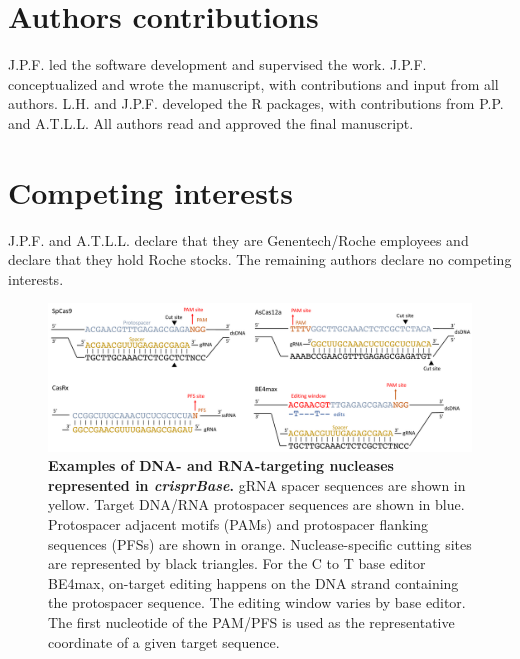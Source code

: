 \documentclass[pdftex,english,10pt]{article}
\begin{document}
{%
\section*{Authors contributions}

J.P.F. led the software development and supervised the work.
J.P.F. conceptualized and wrote the manuscript, with contributions and input from all authors. 
L.H. and J.P.F. developed the R packages, with contributions from P.P. and A.T.L.L. 
All authors read and approved the final manuscript.

\section*{Competing interests}

J.P.F. and A.T.L.L. declare that they are Genentech/Roche employees and declare that they hold Roche stocks. 
The remaining authors declare no competing interests.


\clearpage

\begin{figure}[!h]
\centering
\includegraphics[width=1\textwidth]{Figure1.pdf}
  \caption{\textbf{Examples of DNA- and RNA-targeting nucleases represented in \textit{crisprBase}.} gRNA spacer sequences are shown in yellow. Target DNA/RNA protospacer sequences are shown in blue. Protospacer adjacent motifs (PAMs) and protospacer flanking sequences (PFSs) are shown in orange. Nuclease-specific cutting sites are represented by black triangles. For the C to T base editor BE4max, on-target editing happens on the DNA strand containing the protospacer sequence. The editing window varies by base editor. The first nucleotide of the PAM/PFS is used as the representative coordinate of a given target sequence. 
  }
  \label{fig:nucleases}
\end{figure}



}
\end{document}
